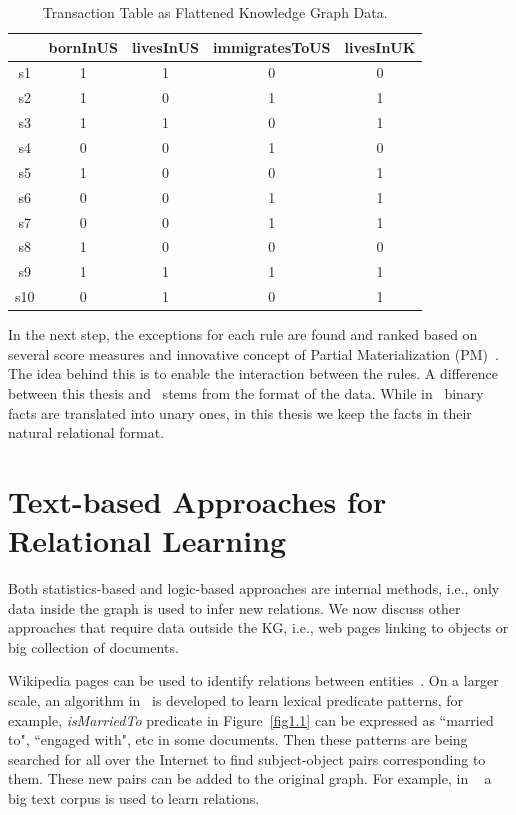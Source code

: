 \begin{table}
\begin{center}
\begin{tabular}{|c|c|c|c|c|}
\hline
 & bornInUS & livesInUS & immigratesToUS & livesInUK\\
\hline\hline
s1 & 1 & 1 & 0 & 0\\
\hline
s2 & 1 & 0 & 1 & 1\\
\hline
s3 & 1 & 1 & 0 & 1\\
\hline
s4 & 0 & 0 & 1 & 0\\
\hline
s5 & 1 & 0 & 0 & 1\\
\hline
s6 & 0 & 0 & 1 & 1\\
\hline
s7 & 0 & 0 & 1 & 1\\
\hline
s8 & 1 & 0 & 0 & 0\\
\hline
s9 & 1 & 1 & 1 & 1\\
\hline
s10 & 0 & 1 & 0 & 1\\
\hline
\end{tabular}
\end{center}
\caption{Transaction Table as Flattened Knowledge Graph Data.}
\label{table2}
\end{table}

In the next step, the exceptions for each rule are found and ranked based on several score measures and innovative concept of Partial Materialization (PM)~\cite{ref12}. The idea behind this is to enable the interaction between the rules. A difference between this thesis and~\cite{ref12} stems from the format of the data. While in~\cite{ref12} binary facts are translated into unary ones, in this thesis we keep the facts in their natural relational format.

\section{Text-based Approaches for Relational Learning}

Both statistics-based and logic-based approaches are internal methods, i.e., only data inside the graph is used to infer new relations. We now discuss other approaches that require data outside the KG, i.e., web pages linking to objects or big collection of documents.

Wikipedia pages can be used to identify relations between entities~\cite{ref18}. On a larger scale, an algorithm in~\cite{ref19} is developed to learn lexical predicate patterns, for example, \textit{isMarriedTo} predicate in Figure~\ref{fig1.1} can be expressed  as ``married to", ``engaged with", etc in some documents. Then these patterns are being searched for all over the Internet to find subject-object pairs corresponding to them. These new pairs can be added to the original graph. For example, in ~\cite{ref19} a  big text corpus is used to learn relations.

